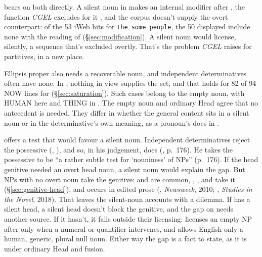 \documentclass[12pt]{article}
\begin{document}
 bears on both directly. A silent noun in  makes  an internal modifier after , the function \textit{CGEL} excludes for it \citep[539]{huddleston2002}, and the corpus doesn't supply the overt counterpart: of the 53 iWeb hits for \texttt{the some people}, the 50 displayed include none with the reading of  (§\ref{sec:modification}). A silent noun would license, silently, a sequence that's excluded overtly. That's the problem \textit{CGEL} raises for partitives, in a new place.

Ellipsis proper also needs a recoverable noun, and independent determinatives often have none. In , nothing in view supplies the set, and that holds for 82 of 94 NOW lines for  (§\ref{sec:saturation}). Such cases belong to the empty noun, with HUMAN here and THING in . The empty noun and ordinary Head agree that no antecedent is needed. They differ in whether the general content sits in a silent noun or in the determinative's own meaning, as a pronoun's does in .

\textcite[175--176]{pullum1975people} offers a test that would favour a silent noun. Independent determinatives reject the possessive (, ), and so, in his judgement, does  (, p.~176). He takes the possessive to be \enquote{a rather subtle test for `nouniness' of NPs} (p.~176). If the head genitive needed an overt head noun, a silent noun would explain the gap. But NPs with no overt noun take the genitive:  and  are common, , , and  take it (§\ref{sec:genitive-head}), and  occurs in edited prose (, \textit{Newsweek}, 2010; , \textit{Studies in the Novel}, 2018). That leaves the silent-noun accounts with a dilemma. If  has a silent head, a silent head doesn't block the genitive, and the gap on  needs another source. If it hasn't, it falls outside their licensing: \textcite[88--89]{lobeck1995ellipsis} licenses an empty NP after  only when a numeral or quantifier intervenes, and \textcite[77]{kester1996adjectival} allows English only a human, generic, plural null noun. Either way the gap is a fact to state, as it is under ordinary Head and fusion.
\end{document}
